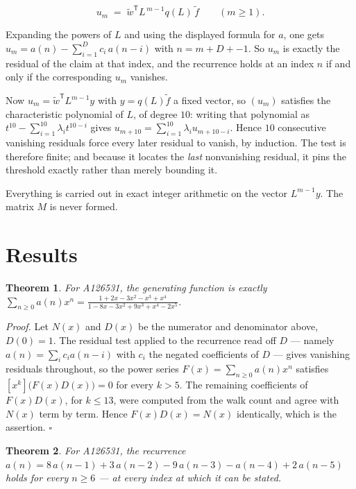 \documentclass[11pt]{article}
\newtheorem{theorem}{Theorem}
\theoremstyle{definition}
\begin{document}
\[u_m \;=\; \tilde w^{\mathsf T} L^{\,m-1} q(L)\,\tilde f \qquad (m \ge 1).\]

Expanding the powers of $L$ and using the displayed formula for $a$, one gets $u_m = a(n) - \sum_{i=1}^{D} c_i\,a(n-i)$ with $n = m + D + -1$. So $u_m$ is exactly the residual of the claim at that index, and the recurrence holds at an index $n$ if and only if the corresponding $u_m$ vanishes.

Now $u_m = \tilde w^{\mathsf T} L^{m-1} y$ with $y = q(L)\tilde f$ a fixed vector, so $(u_m)$ satisfies the characteristic polynomial of $L$, of degree $10$: writing that polynomial as $t^{10} - \sum_{i=1}^{10} \lambda_i t^{10-i}$ gives $u_{m+10} = \sum_{i=1}^{10} \lambda_i u_{m+10-i}$. Hence $10$ consecutive vanishing residuals force every later residual to vanish, by induction. The test is therefore finite; and because it locates the {\itshape last} nonvanishing residual, it pins the threshold exactly rather than merely bounding it.

Everything is carried out in exact integer arithmetic on the vector $L^{m-1}y$. The matrix $M$ is never formed.

\section{Results}

\begin{theorem} For A126531, the generating function is exactly $\sum_{n\ge 0} a(n)x^n = \frac{1 + 2x - 3x^{2} - x^{3} + x^{4}}{1 - 8x - 3x^{2} + 9x^{3} + x^{4} - 2x^{5}}$.\end{theorem}

{\itshape Proof.} Let $N(x)$ and $D(x)$ be the numerator and denominator above, $D(0)=1$. The residual test applied to the recurrence read off $D$ --- namely $a(n) = \sum_i c_i a(n-i)$ with $c_i$ the negated coefficients of $D$ --- gives vanishing residuals throughout, so the power series $F(x)=\sum_{n\ge 0}a(n)x^n$ satisfies $[x^k]\bigl(F(x)D(x)\bigr) = 0$ for every $k > 5$. The remaining coefficients of $F(x)D(x)$, for $k \le 13$, were computed from the walk count and agree with $N(x)$ term by term. Hence $F(x)D(x) = N(x)$ identically, which is the assertion. $\square$

\begin{theorem} For A126531, the recurrence $a(n) = 8\,a(n-1) + 3\,a(n-2) - 9\,a(n-3) - a(n-4) + 2\,a(n-5)$ holds for every $n \ge 6$ --- at every index at which it can be stated.\end{theorem}
\end{document}
